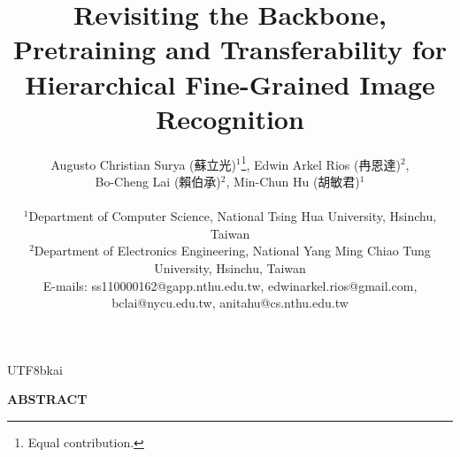 \documentclass[10pt,twocolumn]{article}
\date{}
\begin{document}
\pagestyle{empty} %


\title{\textbf{Revisiting the Backbone, Pretraining and Transferability for \\ Hierarchical Fine-Grained Image Recognition}}
\begin{CJK}{UTF8}{bkai}
\author{
    Augusto Christian Surya (蘇立光)$^{1}$\thanks{Equal contribution.}, 
    Edwin Arkel Rios (冉恩達)$^{2}$\footnotemark[1],\\
    Bo-Cheng Lai (賴伯承)$^{2}$,
    Min-Chun Hu (胡敏君)$^{1}$\\
    \\
    $^{1}$Department of Computer Science, National Tsing Hua University, Hsinchu, Taiwan\\
    $^{2}$Department of Electronics Engineering, National Yang Ming Chiao Tung University, Hsinchu, Taiwan\\
    E-mails: ss110000162@gapp.nthu.edu.tw, edwinarkel.rios@gmail.com, \\
    bclai@nycu.edu.tw, anitahu@cs.nthu.edu.tw
}

\maketitle

\end{CJK}

\thispagestyle{empty}  %


\begin{center}
\textbf{ABSTRACT}
\end{center}
\end{document}
